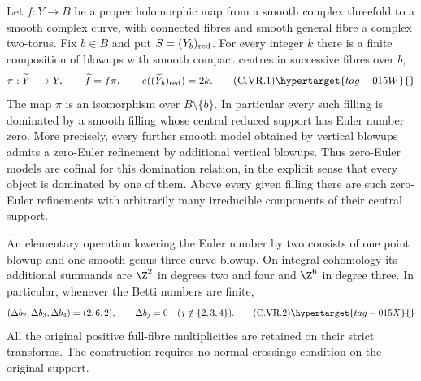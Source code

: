 \begin{proposition}\hypertarget{tag-01DJ}{}\label{cdp:st:C.2.UN.4}

Let $f:Y\to B$ be a proper holomorphic map from a smooth complex
threefold to a smooth complex curve, with connected fibres and smooth
general fibre a complex two-torus. Fix $b\in B$ and put
$S=(Y_b)_{\rm red}$. For every integer $k$ there is a finite composition
of blowups with smooth compact centres in successive fibres over $b$,
\[
 \pi:\widetilde Y\longrightarrow Y,\qquad
 \widetilde f=f\pi,\qquad
 e((\widetilde Y_b)_{\rm red})=2k.                 \tag{C.VR.1}\hypertarget{tag-015W}{}\label{cdp:eq:C.VR.1}
\]
The map $\pi$ is an isomorphism over $B\setminus\{b\}$.
In particular every such filling is dominated by a smooth filling
whose central reduced support has Euler number zero. More precisely,
every further smooth model obtained by vertical blowups admits a
zero-Euler refinement by additional vertical blowups. Thus zero-Euler
models are cofinal for this domination relation, in the explicit sense
that every object is dominated by one of them.
Above every given filling there are such zero-Euler refinements with
arbitrarily many irreducible components of their central support.

An elementary operation lowering the Euler number by two consists of
one point blowup and one smooth genus-three curve blowup. On integral
cohomology its additional summands are $\Z^2$ in degrees two and four
and $\Z^6$ in degree three. In particular, whenever the Betti numbers
are finite,
\[
 (\Delta b_2,\Delta b_3,\Delta b_4)=(2,6,2),
 \qquad \Delta b_j=0\quad(j\notin\{2,3,4\}).       \tag{C.VR.2}\hypertarget{tag-015X}{}\label{cdp:eq:C.VR.2}
\]
All the original positive full-fibre multiplicities are retained on
their strict transforms. The construction requires no normal crossings
condition on the original support.
\end{proposition}



